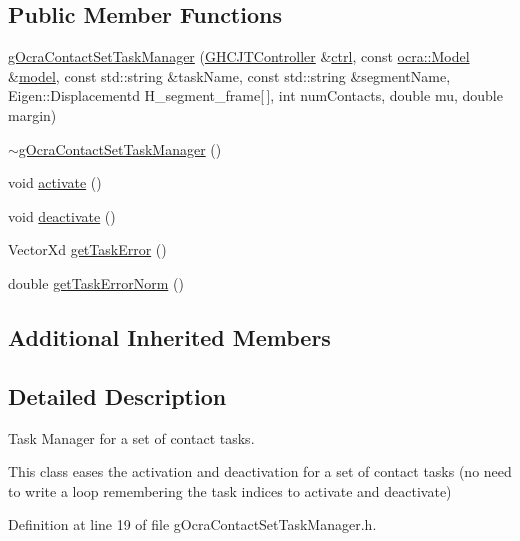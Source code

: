 \subsection*{Public Member Functions}
\begin{DoxyCompactItemize}
\item 
\hyperlink{classgocra_1_1gOcraContactSetTaskManager_a4ff54810c8e8497f59a62b1a87e2c001}{g\+Ocra\+Contact\+Set\+Task\+Manager} (\hyperlink{classgocra_1_1GHCJTController}{G\+H\+C\+J\+T\+Controller} \&\hyperlink{classgocra_1_1gOcraTaskManagerBase_a52d76d9b54d92f3d31faeaafda99e4c7}{ctrl}, const \hyperlink{classocra_1_1Model}{ocra\+::\+Model} \&\hyperlink{classgocra_1_1gOcraTaskManagerBase_adc439e7170f7120611fc6d009d06404e}{model}, const std\+::string \&task\+Name, const std\+::string \&segment\+Name, Eigen\+::\+Displacementd H\+\_\+segment\+\_\+frame\mbox{[}$\,$\mbox{]}, int num\+Contacts, double mu, double margin)
\item 
\hyperlink{classgocra_1_1gOcraContactSetTaskManager_a26033fec662f654121f63ea627a0f5d7}{$\sim$g\+Ocra\+Contact\+Set\+Task\+Manager} ()
\item 
void \hyperlink{classgocra_1_1gOcraContactSetTaskManager_a0fb5ccaae21c77073a6d0f310fe543a4}{activate} ()
\item 
void \hyperlink{classgocra_1_1gOcraContactSetTaskManager_ad9f3b44b46253e5539e658cf3fd8ca37}{deactivate} ()
\item 
Vector\+Xd \hyperlink{classgocra_1_1gOcraContactSetTaskManager_aa0136e8702029873ba4d82c0edc7c571}{get\+Task\+Error} ()
\item 
double \hyperlink{classgocra_1_1gOcraContactSetTaskManager_ac46c258f0b2762bce969b373baad110a}{get\+Task\+Error\+Norm} ()
\end{DoxyCompactItemize}
\subsection*{Additional Inherited Members}


\subsection{Detailed Description}
Task Manager for a set of contact tasks. 

This class eases the activation and deactivation for a set of contact tasks (no need to write a loop remembering the task indices to activate and deactivate) 

Definition at line 19 of file g\+Ocra\+Contact\+Set\+Task\+Manager.\+h.



